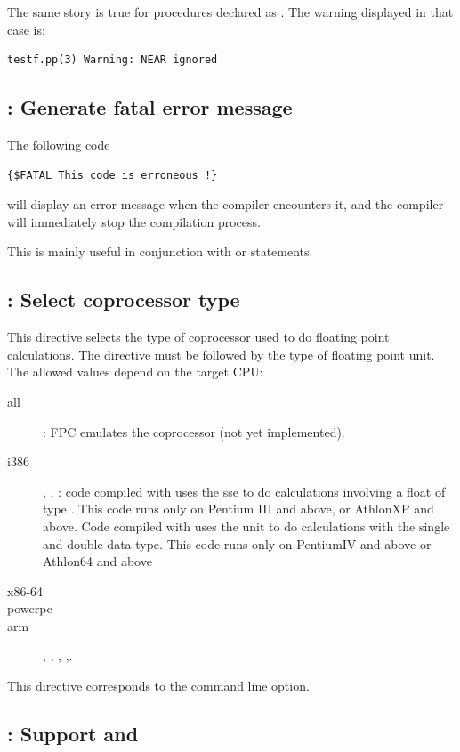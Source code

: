 The same story is true for procedures declared as . The warning
displayed in that case is:
\begin{verbatim}
testf.pp(3) Warning: NEAR ignored
\end{verbatim}

\subsection{ : Generate fatal error message}

The following code
\begin{verbatim}
{$FATAL This code is erroneous !}
\end{verbatim}
will display an error message when the compiler encounters it,
and the compiler will immediately stop the compilation process.

This is mainly useful in conjunction with  or
 statements.

\subsection{ : Select coprocessor type}

This directive selects the type of coprocessor used to do floating point
calculations. The directive must be followed by the type of floating point
unit. The allowed values depend on the target CPU:

\begin{description}
\item[all] : FPC emulates the coprocessor (not yet implemented).
\item[i386] , , : code compiled with  
uses the sse to do calculations involving a float of type .
This code runs only on Pentium III and above, or AthlonXP and above.
Code compiled with  uses the  unit to do calculations 
with the single and double data type. This code runs only on PentiumIV 
and above or Athlon64 and above 
\item[x86-64]  
\item[powerpc]  
\item[arm] , , , ,.
\end{description} 

This directive corresponds to the  command line option.

\subsection{ : Support  and }

